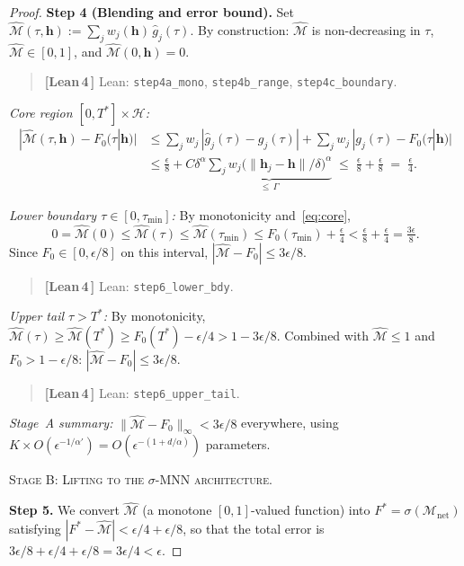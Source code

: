 \documentclass[11pt]{article}
\theoremstyle{remark}
\newcommand{\verified}{%
  \textcolor{green!60!black}{\textbf{[Lean\,4\,\checkmark]}}}
\newcommand{\cH}{\mathcal{H}}
\newcommand{\cM}{\mathcal{M}}
\newcommand{\hhat}{\boldsymbol{h}}
\newcommand{\sigmoid}{\sigma}
\begin{document}
\begin{proof}
\textbf{Step 4 (Blending and error bound).}
Set $\hat{\cM}(\tau,\hhat) := \sum_j w_j(\hhat)\,\hat{g}_j(\tau)$.
By construction:
$\hat{\cM}$ is non-decreasing in $\tau$,
$\hat{\cM} \in [0,1]$, and
$\hat{\cM}(0,\hhat) = 0$.
\begin{quote}\small\verified{} Lean: \texttt{step4a\_mono}, \texttt{step4b\_range},
\texttt{step4c\_boundary}.\end{quote}

\emph{Core region $[0,T^*] \times \cH$:}
\begin{align}
  |\hat{\cM}(\tau,\hhat) - F_0(\tau|\hhat)|
  &\le \sum_j w_j\,|\hat{g}_j(\tau) - g_j(\tau)|
       + \sum_j w_j\,|g_j(\tau) - F_0(\tau|\hhat)|
  \nonumber \\
  &\le \frac{\epsilon}{8}
       + C\delta^{\alpha}
         \underbrace{\sum_j w_j
           \bigl(\|\hhat_j - \hhat\|/\delta\bigr)^{\alpha}}_{\le\,\Gamma}
  \;\le\; \frac{\epsilon}{8} + \frac{\epsilon}{8}
  \;=\; \frac{\epsilon}{4}.
  \label{eq:core}
\end{align}

\emph{Lower boundary $\tau \in [0,\tau_{\min}]$:}
By monotonicity and~\eqref{eq:core},
\[
  0 = \hat{\cM}(0) \le \hat{\cM}(\tau) \le \hat{\cM}(\tau_{\min})
  \le F_0(\tau_{\min}) + \tfrac{\epsilon}{4}
  < \tfrac{\epsilon}{8} + \tfrac{\epsilon}{4} = \tfrac{3\epsilon}{8}.
\]
Since $F_0 \in [0,\epsilon/8]$ on this interval,
$|\hat{\cM} - F_0| \le 3\epsilon/8$.
\begin{quote}\small\verified{} Lean: \texttt{step6\_lower\_bdy}.\end{quote}

\emph{Upper tail $\tau > T^*$:}
By monotonicity,
$\hat{\cM}(\tau) \ge \hat{\cM}(T^*) \ge F_0(T^*) - \epsilon/4
  > 1 - 3\epsilon/8$.
Combined with $\hat{\cM} \le 1$ and $F_0 > 1 - \epsilon/8$:
$|\hat{\cM} - F_0| \le 3\epsilon/8$.
\begin{quote}\small\verified{} Lean: \texttt{step6\_upper\_tail}.\end{quote}

\smallskip
\emph{Stage~A summary:} $\|\hat{\cM} - F_0\|_\infty < 3\epsilon/8$
everywhere, using $K \times O(\epsilon^{-1/\alpha'}) = O(\epsilon^{-(1+d/\alpha)})$
parameters.

\medskip\noindent\textsc{Stage B: Lifting to the $\sigmoid$-MNN architecture.}

\textbf{Step 5.}
We convert $\hat{\cM}$ (a monotone $[0,1]$-valued function) into
$F^* = \sigmoid(\cM_{\mathrm{net}})$ satisfying
$|F^* - \hat{\cM}| < \epsilon/4 + \epsilon/8$,
so that the total error is
$3\epsilon/8 + \epsilon/4 + \epsilon/8 = 3\epsilon/4 < \epsilon$.


\end{proof}
\end{document}
